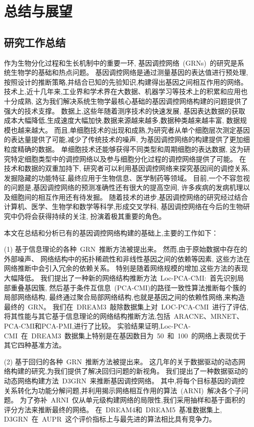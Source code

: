 \section{总结与展望}

\subsection{研究工作总结}

作为生物分化过程和生长机制中的重要一环,
基因调控网络~(GRNs)~的研究是系统生物学的基础和热点问题。
基因调控网络是通过测量基因的表达值进行预处理,
按照设计的推断策略,并结合已知的先验知识,构建得出基因之间相互作用的网络。
技术上,近十几年来,工业界和学术界在大数据、机器学习等技术上的积累和应用也十分成熟,
这为我们解决系统生物学最核心基础的基因调控网络构建的问题提供了强大的技术支撑。
数据上,这些年随着测序技术的快速发展,
基因表达数据的获取成本大幅降低,生成速度大幅加快,数据来源越来越多,数据种类越来越丰富, 数据规模也越来越大。
而且,单细胞技术的出现和成熟,为研究者从单个细胞层次测定基因的表达量提供了可能,减少了传统技术的噪声,
为基因调控网络的构建提供了更加细粒度精确的数据。
单细胞技术还能够获得不同类型和周期细胞的表达数据,
这为研究特定细胞类型中的调控网络以及参与细胞分化过程的调控网络提供了可能。
在技术和数据的双重加持下,
研究者可以利用基因调控网络来探究基因间的调控关系,发掘隐藏的功能特征,最终应用于生物信息、医学制药等领域。
目前,一个不容忽视的问题是,基因调控网络的预测准确性还有很大的提高空间,
许多疾病的发病机理以及细胞间的相互作用还有待发掘。
随着技术的进步,基因调控网络的研究经过结合计算机、医学、生物学和数学等科学,形成交叉学科,
基因调控网络在今后的生物研究中仍将会获得持续的关注, 扮演着极其重要的角色。

本文在总结和分析已有的基因调控网络构建的基础上,主要的工作如下：

(1) 基于信息理论的各种~GRN~推断方法被提出来。
然而,由于原始数据中存在的外部噪声、
网络结构中的拓扑稀疏性和非线性基因之间的依赖等因素,
这些方法在网络推断中会引入冗余的依赖关系。
特别是随着网络规模的增加,这些方法的表现大幅降低。
我们提出了一种新的网络结构推断方法~Loc-PCA-CMI:~首先识别局部重叠基因簇,
然后基于条件互信息~(PCA-CMI)的路径一致性算法推断每个簇的局部网络结构,
最终通过聚合局部网络结构,也就是基因之间的依赖性网络,来构造最终的~GRN。
我们在~DREAM3~敲除数据集上对~LOC-PCA-CMI~进行了评估,
将其性能与其它基于信息理论的网络结构推断方法,包括~ARACNE、MRNET、PCA-CMI和PCA-PMI,进行了比较。
实验结果证明,Loc-PCA-CMI~在~DREAM3~数据集上特别是在基因数目为~50~和~100~的网络上表现优于其它四种基准方法。

(2) 基于回归的各种~GRN~推断方法被提出来。
这几年的关于数据驱动的动态网络构建的研究,为我们提供了解决回归问题的新视角。
我们提出了一种数据驱动的动态网络构建方法~D3GRN~来推断基因调控网络。
其中,将每个目标基因的调控关系转化为功能分解问题,并利用揭示网络相互作用的算法~(ARNI)~解决各个子问题。
为了弥补~ARNI~仅从单元级构建网络的局限性,我们采用抽样和基于面积的评分方法来推断最终的网络。
在~DREAM4和~DREAM5~基准数据集上, D3GRN~在~AUPR~这个评价指标上与最先进的算法相比具有竞争力。

